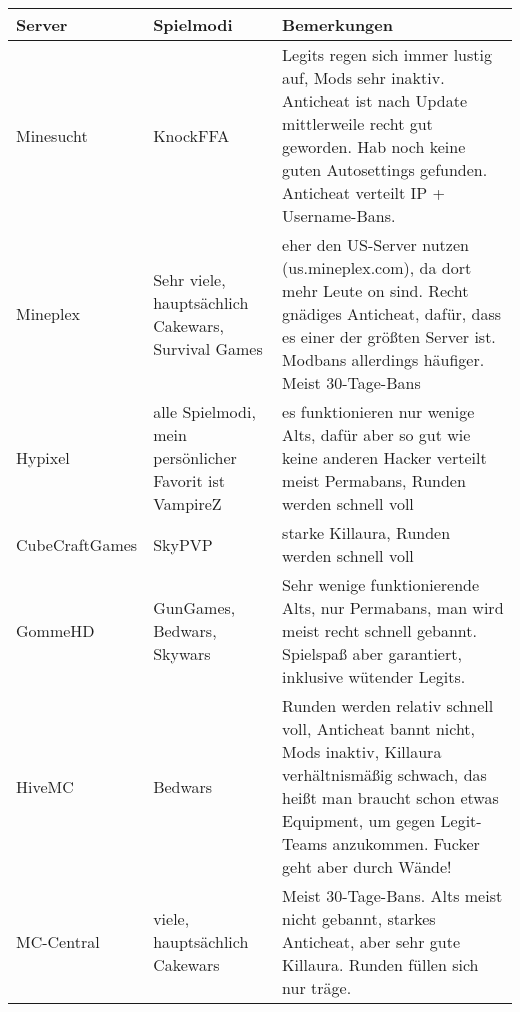 \begin{longtable}{p{4cm}|p{4cm}|p{4cm}}
    \textbf{Server} & \textbf{Spielmodi} & \textbf{Bemerkungen} \\
    \hline
    Minesucht & KnockFFA & Legits regen sich immer lustig auf, Mods sehr inaktiv. Anticheat ist nach Update mittlerweile recht gut geworden. Hab noch keine guten Autosettings gefunden. Anticheat verteilt IP + Username-Bans. \\
    \hline
    Mineplex & Sehr viele, hauptsächlich Cakewars, Survival Games & eher den US-Server nutzen (us.mineplex.com), da dort mehr Leute on sind. Recht gnädiges Anticheat, dafür, dass es einer der größten Server ist. Modbans allerdings häufiger. Meist 30-Tage-Bans \\
    \hline
    Hypixel & alle Spielmodi, mein persönlicher Favorit ist VampireZ & es funktionieren nur wenige Alts, dafür aber so gut wie keine anderen Hacker verteilt meist Permabans, Runden werden schnell voll \\
    \hline
    CubeCraftGames & SkyPVP & starke Killaura, Runden werden schnell voll \\
    \hline
    GommeHD & GunGames, Bedwars, Skywars & Sehr wenige funktionierende Alts, nur Permabans, man wird meist recht schnell gebannt. Spielspaß aber garantiert, inklusive wütender Legits. \\
    \hline
    HiveMC & Bedwars & Runden werden relativ schnell voll, Anticheat bannt nicht, Mods inaktiv, Killaura verhältnismäßig schwach, das heißt man braucht schon etwas Equipment, um gegen Legit-Teams anzukommen. Fucker geht aber durch Wände! \\
    \hline
    MC-Central & viele, hauptsächlich Cakewars & Meist 30-Tage-Bans. Alts meist nicht gebannt, starkes Anticheat, aber sehr gute Killaura. Runden füllen sich nur träge.
\end{longtable}
